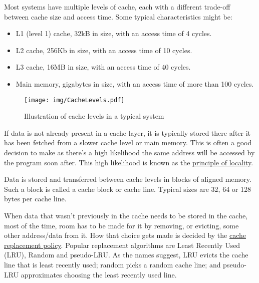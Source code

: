 \documentclass[a4paper,]{report}
\makeatletter
\providecommand{\tightlist}{%
  \setlength{\itemsep}{0pt}\setlength{\parskip}{0pt}}
\newcounter{figno}
\newenvironment{fignos:no-prefix-figure-caption}{
  \caption@ifcompatibility{}{
    \let\oldthefigure\thefigure
    \let\oldtheHfigure\theHfigure
    \renewcommand{\thefigure}{figno:\thefigno}
    \renewcommand{\theHfigure}{figno:\thefigno}
    \stepcounter{figno}
    \captionsetup{labelformat=empty}
  }
}{
  \caption@ifcompatibility{}{
    \captionsetup{labelformat=default}
    \let\thefigure\oldthefigure
    \let\theHfigure\oldtheHfigure
    \addtocounter{figure}{-1}
  }
}
\makeatother
\begin{document}
Most systems have multiple levels of cache,
each with a different trade-off between cache size and
access time. Some typical characteristics might
be:

\begin{itemize}
\tightlist
\item
  L1 (level 1) cache, 32kB in size, with an access time of 4 cycles.
\item
  L2 cache, 256Kb in size, with an access time of 10 cycles.
\item
  L3 cache, 16MB in size, with an access time of 40 cycles.
\item
  Main memory, gigabytes in size, with an access time of more than 100
  cycles.
\end{itemize}

\begin{fignos:no-prefix-figure-caption}

\begin{figure}
\centering
\texttt{[image: img/CacheLevels.pdf]}
\caption{Illustration of cache levels in a typical system}
\end{figure}

\end{fignos:no-prefix-figure-caption}

If data is not already present in a cache layer, it is typically stored
there after it has been fetched from a slower cache level or main
memory. This is often a good decision to make as there's a high
likelihood the same address will be accessed by the program soon after.
This high likelihood is known as the
\href{https://en.wikipedia.org/wiki/Locality_of_reference}{principle of
locality}.

Data is stored and transferred between cache levels in blocks of aligned
memory. Such a block is called a cache block or cache
line. Typical sizes are 32, 64 or 128 bytes per cache
line.

When data that wasn't previously in the cache needs to be stored in the
cache, most of the time, room has to be made for it by removing, or
evicting, some other address/data from it. How
that choice gets made is decided by the
\href{https://en.wikipedia.org/wiki/Cache_replacement_policies}{cache
replacement policy}. Popular replacement algorithms are Least Recently
Used (LRU),
Random and
pseudo-LRU. As the names suggest,
LRU evicts the cache line that is least recently used; random picks a
random cache line; and pseudo-LRU approximates choosing the least
recently used line.
\end{document}
